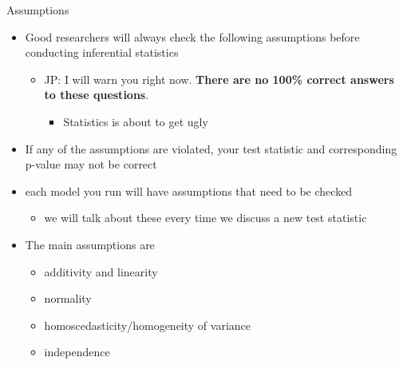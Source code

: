 \documentclass[
  ignorenonframetext,
]{beamer}
\providecommand{\tightlist}{%
  \setlength{\itemsep}{0pt}\setlength{\parskip}{0pt}}
\begin{document}
\begin{frame}{Assumptions}
\protect\hypertarget{assumptions}{}
\begin{itemize}
\item
  Good researchers will always check the following assumptions before
  conducting inferential statistics

  \begin{itemize}
  \item
    JP: I will warn you right now. \textbf{There are no 100\% correct
    answers to these questions}.

    \begin{itemize}
    \tightlist
    \item
      Statistics is about to get ugly
    \end{itemize}
  \end{itemize}
\item
  If any of the assumptions are violated, your test statistic and
  corresponding p-value may not be correct
\item
  each model you run will have assumptions that need to be checked

  \begin{itemize}
  \tightlist
  \item
    we will talk about these every time we discuss a new test statistic
  \end{itemize}
\item
  The main assumptions are

  \begin{itemize}
  \item
    additivity and linearity
  \item
    normality
  \item
    homoscedasticity/homogeneity of variance
  \item
    independence
  \end{itemize}
\end{itemize}
\end{frame}
\end{document}
